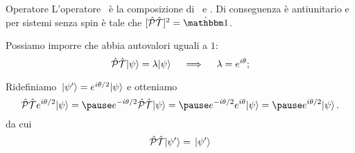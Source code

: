 \begin{frame}{Operatore \hPT}
    L'operatore \hPT\ è la composizione di \hP\ e \hT. Di conseguenza è antiunitario e per sistemi senza spin è tale che $\bqty*{\hPT}\!^2 = \hidM$.

    \pause
    Possiamo imporre che abbia autovalori uguali a $1$:
    \begin{equation*}
        \mathcal{\hat{P}}\mathcal{\hat{T}}\!\ket{\psi} = \lambda\!\ket{\psi}
        \quad\implies\quad
        \lambda = e^{i\theta}
        \text{;}
    \end{equation*}
    
    Ridefiniamo $\ket*{\psi'} = e^{i\theta/2}\!\ket{\psi}$ e otteniamo
    \begin{equation*}
        \hPT e^{i\theta/2}\!\ket{\psi}
        =\pause e^{-i\theta/2}\hPT\!\ket{\psi}
        =\pause e^{-i\theta/2}e^{i\theta}\!\ket{\psi}
        =\pause e^{i\theta/2}\!\ket{\psi}
        \myperiod
    \end{equation*}
    \pause
    da cui $$\mathcal{\hat{P}}\mathcal{\hat{T}}\!\ket*{\psi'} = \ket*{\psi'}$$
\end{frame}

